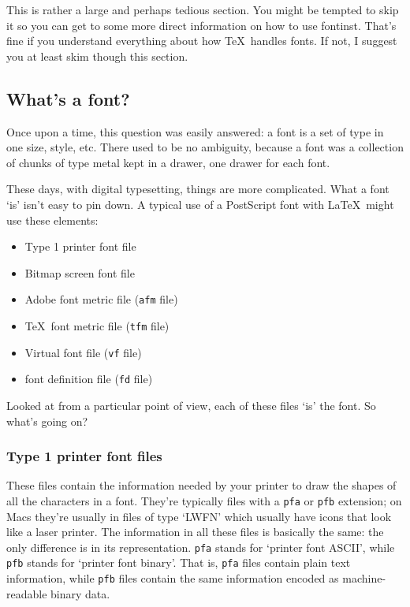 \documentclass[a4paper]{ltxguide}
\newcommand{\PS}{Post\-Script\xspace}
\newcommand*{\setfilename}[1]{\texttt{#1}}
\newcommand*{\setpackagename}[1]{\textsf{#1}}
\newcommand{\fontinst}{\setpackagename{font\-inst}\xspace}
\newcommand{\vf} {\setfilename{vf}\xspace}
\newcommand{\fd} {\setfilename{fd}\xspace}
\newcommand{\afm}{\setfilename{afm}\xspace}
\newcommand{\tfm}{\setfilename{tfm}\xspace}
\newcommand{\pfa}{\setfilename{pfa}\xspace}
\newcommand{\pfb}{\setfilename{pfb}\xspace}
\begin{document}
This is rather a large and perhaps tedious section.  You might be
tempted to skip it so you can get to some more direct information on
how to use \fontinst.  That's fine if you understand everything about
how \TeX\ handles fonts.  If not, I suggest you at least skim though
this section.

\subsection{What's a font?}

Once upon a time, this question was easily answered: a font is a
set of type in one size, style, etc.  There used to be no
ambiguity, because a font was a collection of chunks of type metal
kept in a drawer, one drawer for each font.

These days, with digital typesetting, things are more complicated.
What a font `is' isn't easy to pin down.  A typical use of a \PS
font with \LaTeX\ might use these elements:
\begin{itemize}
\item Type 1 printer font file
\item Bitmap screen font file
\item Adobe font metric file (\afm file)
\item \TeX\ font metric file (\tfm file)
\item Virtual font file (\vf file)
\item font definition file (\fd file)
\end{itemize}
Looked at from a particular point of view, each of these files
`is' the font.  So what's going on?


\subsubsection{Type 1 printer font files}

These files contain the information needed by your printer to draw
the shapes of all the characters in a font.  They're typically
files with a \pfa or \pfb extension; on Macs they're usually in
files of type `LWFN' which usually have icons that look like a
laser printer.  The information in all these files is basically
the same: the only difference is in its representation.  \pfa
stands for `printer font ASCII', while \pfb stands for `printer
font binary'.  That is, \pfa files contain plain text information,
while \pfb files contain the same information encoded as
machine-readable binary data.
\end{document}
